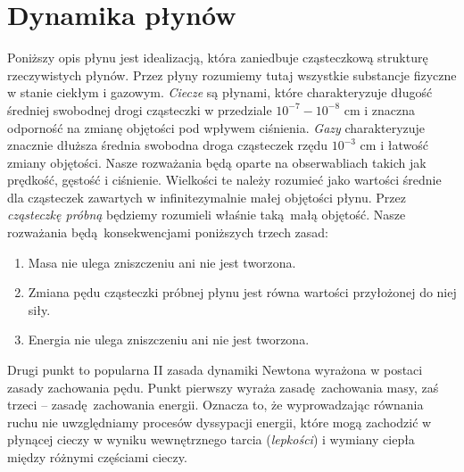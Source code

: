 \section{Dynamika płynów}

Poniższy opis płynu jest idealizacją, która zaniedbuje cząsteczkową strukturę rzeczywistych płynów. Przez płyny rozumiemy tutaj wszystkie substancje fizyczne w stanie ciekłym i gazowym. \emph{Ciecze} są płynami, które charakteryzuje długość średniej swobodnej drogi cząsteczki w przedziale \(10^{-7} - 10^{-8}\) cm i znaczna odporność na zmianę objętości pod wpływem ciśnienia. \emph{Gazy} charakteryzuje znacznie dłuższa średnia swobodna droga cząsteczek rzędu \(10^{-3}\) cm i łatwość zmiany objętości. Nasze rozważania będą oparte na obserwabliach takich jak prędkość, gęstość i ciśnienie. Wielkości te należy rozumieć jako wartości średnie dla cząsteczek zawartych w infinitezymalnie małej objętości płynu. Przez \emph{cząsteczkę próbną} będziemy rozumieli właśnie taką małą objętość. Nasze rozważania będą konsekwencjami poniższych trzech zasad:
\begin{enumerate}
    \item Masa nie ulega zniszczeniu ani nie jest tworzona.
    \item Zmiana pędu cząsteczki próbnej płynu jest równa wartości przyłożonej do niej siły.
    \item Energia nie ulega zniszczeniu ani nie jest tworzona. 
\end{enumerate}
Drugi punkt to popularna II zasada dynamiki Newtona wyrażona w postaci zasady zachowania pędu. Punkt pierwszy wyraża zasadę zachowania masy, zaś trzeci – zasadę zachowania energii. Oznacza to, że wyprowadzając równania ruchu nie uwzględniamy procesów dyssypacji energii, które mogą zachodzić w płynącej cieczy w wyniku wewnętrznego tarcia (\emph{lepkości}) i wymiany ciepła między różnymi częściami cieczy.

